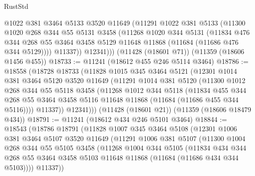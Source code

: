 \begin{lexlean}{RustStd}
\begin{coremodule}
{{{{{{{{{{{{{{{{{{{          @1022
          @381
          @3464
          @5133
          @3520
          @11649
          (@11291
            @1022
            @381
            @5133
            (@11300
              @1020
              @268
              @344
              @55
              @5131
              @3458
              (@11268
                @1020
                @344
                @5131
                (@11834
                  @476
                  @344
                  @268
                  @55
                  @3464
                  @3458
                  @5129
                  @11648
                  @11868
                  (@11684 (@11686 @476 @344 @5129))))
              @11337))
          @12341)))
    (@11428 (@18601 @71))
    (@11359 (@18606 @1456 @455))
@18733 := @11241 (@18612 @455 @246 @5114 @3464)
@18786 := @18558
    (@18728
      @18733
      (@11828
        @1015
        @345
        @3464
        @5121
        (@12301
          @1014
          @381
          @3464
          @5120
          @3520
          @11649
          (@11291
            @1014
            @381
            @5120
            (@11300
              @1012
              @268
              @344
              @55
              @5118
              @3458
              (@11268
                @1012
                @344
                @5118
                (@11834
                  @455
                  @344
                  @268
                  @55
                  @3464
                  @3458
                  @5116
                  @11648
                  @11868
                  (@11684 (@11686 @455 @344 @5116))))
              @11337))
          @12341)))
    (@11428 (@18601 @21))
    (@11359 (@18606 @18479 @434))
@18791 := @11241 (@18612 @434 @246 @5101 @3464)
@18844 := @18543
    (@18786
      @18791
      (@11828
        @1007
        @345
        @3464
        @5108
        (@12301
          @1006
          @381
          @3464
          @5107
          @3520
          @11649
          (@11291
            @1006
            @381
            @5107
            (@11300
              @1004
              @268
              @344
              @55
              @5105
              @3458
              (@11268
                @1004
                @344
                @5105
                (@11834
                  @434
                  @344
                  @268
                  @55
                  @3464
                  @3458
                  @5103
                  @11648
                  @11868
                  (@11684 (@11686 @434 @344 @5103))))
              @11337))
}}}}}}}}}}}}}}}}}}}
\end{coremodule}
\end{lexlean}
